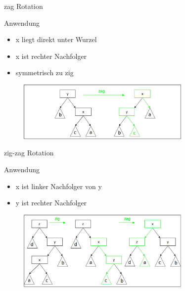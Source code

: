 \documentclass[11pt]{beamer}
\begin{document}
		\begin{frame}{zag  Rotation}
			\begin{block}{Anwendung }
				\begin{itemize}
					\item x liegt direkt unter Wurzel
					\item x ist rechter Nachfolger
					\item symmetrisch zu zig
				\end{itemize}
			\end{block}
			\pause
			\begin{figure}[h]
				\centering
				\includegraphics[width=0.75\textwidth]{"bilder/zagRotation"}
			\end{figure}
			
		\end{frame}	
	
	\begin{frame}{zig-zag  Rotation}
		\begin{block}{Anwendung}
			\begin{itemize}
				\item x ist linker Nachfolger von y
				\item y ist rechter Nachfolger
			\end{itemize}
		\end{block}
		\pause
		\begin{figure}[h]
			\centering
			\includegraphics[width=0.75\textwidth]{"bilder/zigzagRotation"}
		\end{figure}
	\end{frame}
	
\end{document}
